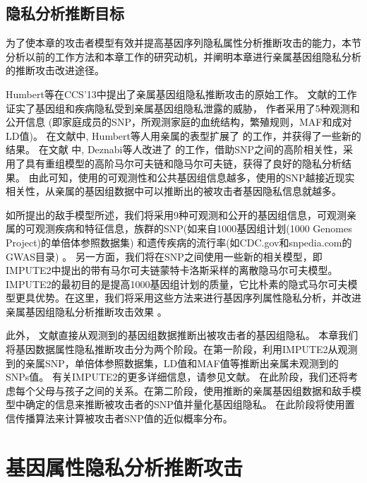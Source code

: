 \subsection{隐私分析推断目标}

为了使本章的攻击者模型有效并提高基因序列隐私属性分析推断攻击的能力，本节分析以前的工作方法和本章工作的研究动机，并阐明本章进行亲属基因组隐私分析的推断攻击改进途径。

Humbert等\cite{humbert2013addressing}在CCS'13中提出了亲属基因组隐私推断攻击的原始工作。 文献\cite{humbert2013addressing}的工作证实了基因组和疾病隐私受到亲属基因组隐私泄露的威胁， 作者采用了5种观测和公开信息 (即家庭成员的SNP，所观测家庭的血统结构，繁殖规则，MAF和成对LD值)。 在文献\cite{humbert2017quantifying}中, Humbert等人用亲属的表型扩展了\cite{humbert2013addressing} 的工作，并获得了一些新的结果。
在文献\cite{deznabi2018inference} 中, Deznabi等人改进了\cite{humbert2013addressing} 的工作，借助SNP之间的高阶相关性，采用了具有重组模型的高阶马尔可夫链和隐马尔可夫链\cite{marchini2007newa,samani2015quantifying}，获得了良好的隐私分析结果。
由此可知，使用的可观测性和公共基因组信息越多，使用的SNP越接近现实相关性，从亲属的基因组数据中可以推断出的被攻击者基因隐私信息就越多。

如所提出的敌手模型所述，我们将采用9种可观测和公开的基因组信息，可观测亲属的可观测疾病和特征信息，族群的SNP(如来自1000基因组计划(1000 Genomes Project)的单倍体参照数据集) 和遗传疾病的流行率(如CDC.gov和snpedia.com的GWAS目录) 。 另一方面，我们将在SNP之间使用一些新的相关模型，即IMPUTE2中提出的带有马尔可夫链蒙特卡洛斯采样的离散隐马尔可夫模型\cite{howie2014impute2}。IMPUTE2的最初目的是提高1000基因组计划的质量，它比朴素的隐式马尔可夫模型\cite{marchini2007newa,samani2015quantifying}更具优势。在这里，我们将采用这些方法来进行基因序列属性隐私分析，并改进亲属基因组隐私分析推断攻击效果 。

此外， 文献\cite{humbert2013addressing,humbert2017quantifying,deznabi2018inference}直接从观测到的基因组数据推断出被攻击者的基因组隐私。 本章我们将基因数据属性隐私推断攻击分为两个阶段。在第一阶段，利用IMPUTE2从观测到的亲属SNP，单倍体参照数据集，LD值和MAF值等推断出亲属未观测到的SNPs值。 有关IMPUTE2的更多详细信息，请参见文献\cite{howie2014impute2}。
在此阶段，我们还将考虑每个父母与孩子之间的关系。在第二阶段，使用推断的亲属基因组数据和敌手模型中确定的信息来推断被攻击者的SNP值并量化基因组隐私。 在此阶段将使用置信传播算法来计算被攻击者SNP值的近似概率分布。

\section{基因属性隐私分析推断攻击}
\label{sec:inference-attack}

